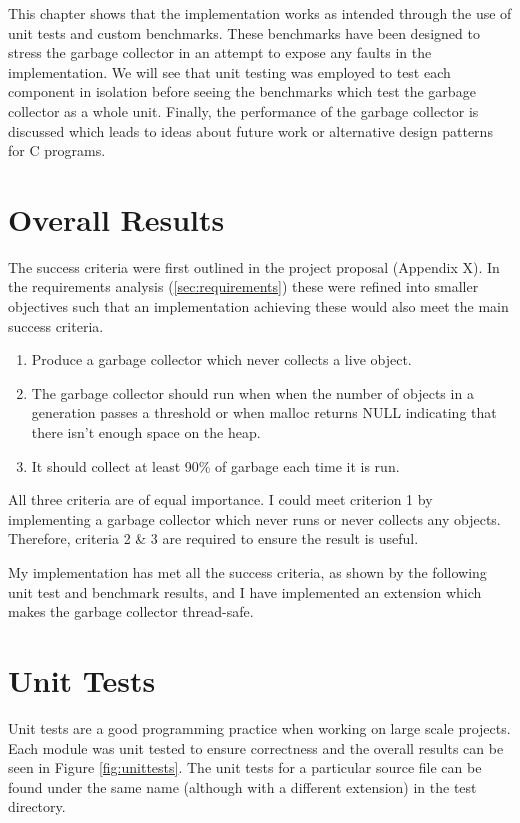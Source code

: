 \documentclass[../diss.tex]{subfiles}
\begin{document}
This chapter shows that the implementation works as intended through the use of unit tests and custom benchmarks. These benchmarks have been designed to stress the garbage collector in an attempt to expose any faults in the implementation. We will see that unit testing was employed to test each component in isolation before seeing the benchmarks which test the garbage collector as a whole unit. Finally, the performance of the garbage collector is discussed which leads to ideas about future work or alternative design patterns for C programs.

\section{Overall Results} \label{sec:overallresults}


The success criteria were first outlined in the project proposal (Appendix X). In the requirements analysis (\cref{sec:requirements}) these were refined into smaller objectives such that an implementation achieving these would also meet the main success criteria.

\begin{enumerate}
    \item Produce a garbage collector which never collects a live object.
    \item The garbage collector should run when when the number of objects in a generation passes a threshold or when malloc returns NULL indicating that there isn't enough space on the heap.
    \item  It should collect at least 90\% of garbage each time it is run.
\end{enumerate}
 
All three criteria are of equal importance. I could meet criterion 1 by implementing a garbage collector which never runs or never collects any objects. Therefore, criteria 2 \& 3 are required to ensure the result is useful.

My implementation has met all the success criteria, as shown by the following unit test and benchmark results, and I have implemented an extension which makes the garbage collector thread-safe.

\section{Unit Tests}

Unit tests are a good programming practice when working on large scale projects. Each module was unit tested to ensure correctness and the overall results can be seen in Figure \ref{fig:unittests}. The unit tests for a particular source file can be found under the same name (although with a different extension) in the test directory.
\end{document}
